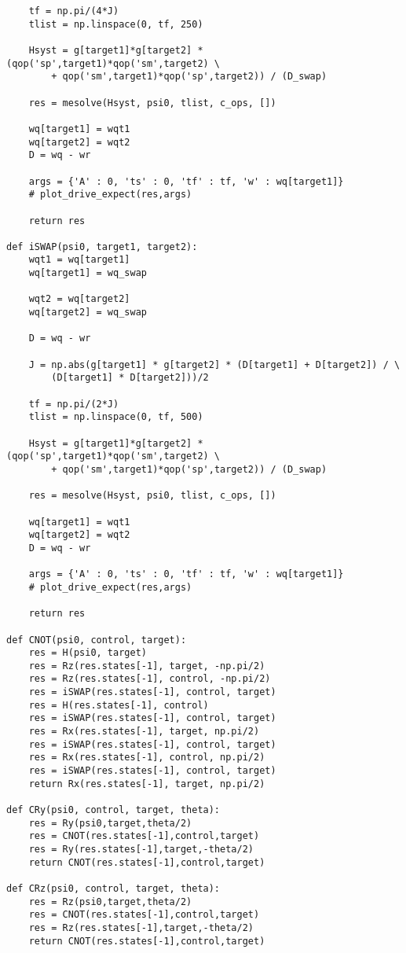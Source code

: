 \begin{verbatim}
    tf = np.pi/(4*J)
    tlist = np.linspace(0, tf, 250)

    Hsyst = g[target1]*g[target2] * (qop('sp',target1)*qop('sm',target2) \
        + qop('sm',target1)*qop('sp',target2)) / (D_swap)

    res = mesolve(Hsyst, psi0, tlist, c_ops, [])

    wq[target1] = wqt1
    wq[target2] = wqt2
    D = wq - wr

    args = {'A' : 0, 'ts' : 0, 'tf' : tf, 'w' : wq[target1]}
    # plot_drive_expect(res,args)

    return res

def iSWAP(psi0, target1, target2):
    wqt1 = wq[target1]
    wq[target1] = wq_swap
    
    wqt2 = wq[target2]
    wq[target2] = wq_swap

    D = wq - wr

    J = np.abs(g[target1] * g[target2] * (D[target1] + D[target2]) / \
        (D[target1] * D[target2]))/2

    tf = np.pi/(2*J)
    tlist = np.linspace(0, tf, 500)

    Hsyst = g[target1]*g[target2] * (qop('sp',target1)*qop('sm',target2) \
        + qop('sm',target1)*qop('sp',target2)) / (D_swap)

    res = mesolve(Hsyst, psi0, tlist, c_ops, [])

    wq[target1] = wqt1
    wq[target2] = wqt2
    D = wq - wr

    args = {'A' : 0, 'ts' : 0, 'tf' : tf, 'w' : wq[target1]}
    # plot_drive_expect(res,args)

    return res

def CNOT(psi0, control, target):
    res = H(psi0, target)
    res = Rz(res.states[-1], target, -np.pi/2)
    res = Rz(res.states[-1], control, -np.pi/2)
    res = iSWAP(res.states[-1], control, target)
    res = H(res.states[-1], control)
    res = iSWAP(res.states[-1], control, target)
    res = Rx(res.states[-1], target, np.pi/2)
    res = iSWAP(res.states[-1], control, target)
    res = Rx(res.states[-1], control, np.pi/2)
    res = iSWAP(res.states[-1], control, target)
    return Rx(res.states[-1], target, np.pi/2)

def CRy(psi0, control, target, theta):
    res = Ry(psi0,target,theta/2)
    res = CNOT(res.states[-1],control,target)
    res = Ry(res.states[-1],target,-theta/2)
    return CNOT(res.states[-1],control,target)

def CRz(psi0, control, target, theta):
    res = Rz(psi0,target,theta/2)
    res = CNOT(res.states[-1],control,target)
    res = Rz(res.states[-1],target,-theta/2)
    return CNOT(res.states[-1],control,target)


\end{verbatim}
